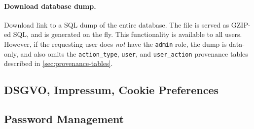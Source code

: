 \paragraph*{Download database dump.}
Download link to a SQL dump of the entire database.
The file is served as GZIP-ed SQL, and is generated on the fly.
This functionality is available to all users.
However, if the requesting user does \emph{not} have the \verb!admin! role, the dump is data-only, and also omits the \verb!action_type!, \verb!user!, and \verb!user_action! provenance tables described in \cref{sec:provenance-tables}.


\subsection{DSGVO, Impressum, Cookie Preferences}


\subsection{Password Management}
